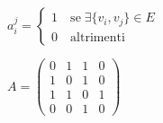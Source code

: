 \begin{flushleft}
\begin{itemize}[nosep]
        {\centering
            \begin{minipage}[t]{0.45\textwidth}
                \centering
                $a_i^j = \begin{cases} 1 \quad \text{se} \; \exists \{v_i, v_j\} \in E \\
                0 \quad \text{altrimenti} \end{cases}$
            \end{minipage}
            \hfill
            \begin{minipage}[t]{0.45\textwidth}
                \centering
                $A = \left(\begin{array}{cccc} 0 & 1 & 1 & 0 \\
                    1 & 0 & 1 & 0 \\
                    1 & 1 & 0 & 1 \\
                    0 & 0 & 1 & 0 \end{array}\right)$
            \end{minipage}
        \par}
    \end{itemize}
\end{flushleft}

